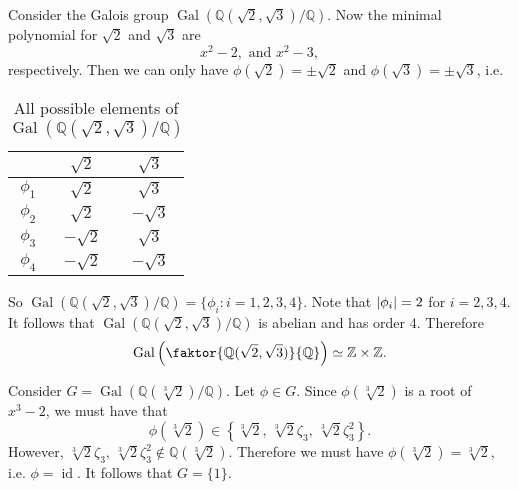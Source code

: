 \documentclass[notoc,notitlepage]{tufte-book}
\DeclareMathOperator{\Gal}{Gal}
\DeclareMathOperator{\id}{id}
\begin{document}
\begin{eg}
  Consider the Galois group $\Gal( \mathbb{Q}(\sqrt{2}, \sqrt{3}) / \mathbb{Q}
  )$. Now the minimal polynomial for $\sqrt{2}$ and $\sqrt{3}$ are
  \begin{equation*}
    x^2 - 2, \text{ and } x^2 - 3,
  \end{equation*}
  respectively. Then we can only have $\phi(\sqrt{2}) = \pm \sqrt{2}$ and
  $\phi(\sqrt{3}) = \pm \sqrt{3}$, i.e.
  \begin{table}[ht]
    \centering
    \caption{All possible elements of $\Gal(\mathbb{Q}(\sqrt{2}, \sqrt{3}) /
    \mathbb{Q})$}
    \label{table:all_possible_elements_of_gal_q_sqrt_2_sqrt_3_q}
    \begin{tabular}{c | c c}
               & $\sqrt{2}$  & $\sqrt{3}$ \\
       \hline
      $\phi_1$ & $\sqrt{2}$  & $\sqrt{3}$ \\
      $\phi_2$ & $\sqrt{2}$  & $-\sqrt{3}$ \\
      $\phi_3$ & $-\sqrt{2}$ & $\sqrt{3}$ \\
      $\phi_4$ & $-\sqrt{2}$ & $-\sqrt{3}$
    \end{tabular}
  \end{table}
  So $\Gal( \mathbb{Q}(\sqrt{2}, \sqrt{3}) / \mathbb{Q} ) = \{ \phi_i : i = 1,
  2, 3, 4 \}$. Note that $\left|\phi_i\right| = 2$ for $i = 2, 3, 4$. It follows that
  $\Gal( \mathbb{Q}(\sqrt{2}, \sqrt{3}) / \mathbb{Q} )$ is abelian and has order
  $4$. Therefore
  \begin{equation*}
    \Gal \left( \faktor{\mathbb{Q}(\sqrt{2}, \sqrt{3})}{\mathbb{Q}} \right)
    \simeq \mathbb{Z} \times \mathbb{Z}.
  \end{equation*}
\end{eg}


\begin{eg}\label{eg:galois_elements_can_only_permute_roots_in_the_same_field}
  Consider $G = \Gal(\mathbb{Q}(\sqrt[3]{2}) / \mathbb{Q})$. Let $\phi \in G$.
  Since $\phi(\sqrt[3]{2})$ is a root of $x^3 - 2$, we must have that
  \begin{equation*}
    \phi(\sqrt[3]{2}) \in \left\{ \sqrt[3]{2}, \, \sqrt[3]{2} \zeta_3, \,
    \sqrt[3]{2} \zeta_3^2 \right\}.
  \end{equation*}
  However, $\sqrt[3]{2} \zeta_3, \, \sqrt[3]{2} \zeta_3^2 \notin
  \mathbb{Q}(\sqrt[3]{2})$. Therefore we must have $\phi(\sqrt[3]{2}) =
  \sqrt[3]{2}$, i.e. $\phi = \id$. It follows that $G = \{ 1 \}$.
\end{eg} 
\end{document}
